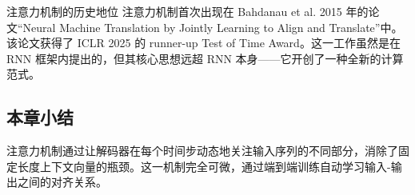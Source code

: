 \begin{knowledgebox}{注意力机制的历史地位}
注意力机制首次出现在 Bahdanau et al. 2015 年的论文``Neural Machine Translation by Jointly Learning to Align and Translate''中。该论文获得了 ICLR 2025 的 runner-up Test of Time Award。这一工作虽然是在 RNN 框架内提出的，但其核心思想远超 RNN 本身——它开创了一种全新的计算范式。
\end{knowledgebox}

\subsection{本章小结}

注意力机制通过让解码器在每个时间步动态地关注输入序列的不同部分，消除了固定长度上下文向量的瓶颈。这一机制完全可微，通过端到端训练自动学习输入-输出之间的对齐关系。


